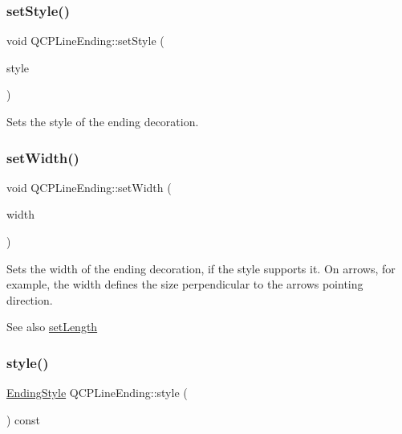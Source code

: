 \subsubsection{\texorpdfstring{setStyle()}{setStyle()}}
{\footnotesize\ttfamily void Q\+C\+P\+Line\+Ending\+::set\+Style (\begin{DoxyParamCaption}\item[{\mbox{\hyperlink{class_q_c_p_line_ending_a5ef16e6876b4b74959c7261d8d4c2cd5}{Q\+C\+P\+Line\+Ending\+::\+Ending\+Style}}}]{style }\end{DoxyParamCaption})}

Sets the style of the ending decoration. \mbox{\label{class_q_c_p_line_ending_a26dc020ea985a72cc25881ce2115e34e}} 
\subsubsection{\texorpdfstring{setWidth()}{setWidth()}}
{\footnotesize\ttfamily void Q\+C\+P\+Line\+Ending\+::set\+Width (\begin{DoxyParamCaption}\item[{double}]{width }\end{DoxyParamCaption})}

Sets the width of the ending decoration, if the style supports it. On arrows, for example, the width defines the size perpendicular to the arrow\textquotesingle{}s pointing direction.

\begin{DoxySeeAlso}{See also}
\mbox{\hyperlink{class_q_c_p_line_ending_ae36fa01763751cd64b7f56c3507e935a}{set\+Length}} 
\end{DoxySeeAlso}
\mbox{\label{class_q_c_p_line_ending_a07e75aaac6c61322bf51af237c5778e3}} 
\subsubsection{\texorpdfstring{style()}{style()}}
{\footnotesize\ttfamily \mbox{\hyperlink{class_q_c_p_line_ending_a5ef16e6876b4b74959c7261d8d4c2cd5}{Ending\+Style}} Q\+C\+P\+Line\+Ending\+::style (\begin{DoxyParamCaption}{ }\end{DoxyParamCaption}) const\hspace{0.3cm}{\ttfamily [inline]}}

